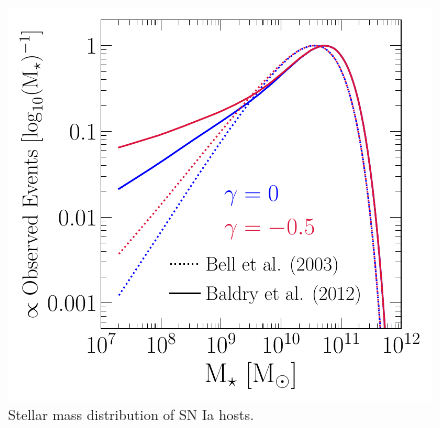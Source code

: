 \documentclass[ms.tex]{subfiles}
\begin{document}
\begin{itemize}
\begin{figure}
\centering
\includegraphics[scale = 0.55]{ia_massdist.pdf}
\caption{
Stellar mass distribution of SN Ia hosts.
}
\label{fig:hostmassdist}
\end{figure}

\end{itemize}
\end{document}
